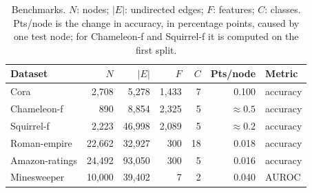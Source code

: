 \begin{table}[t]
\centering
\caption{Benchmarks. $N$: nodes; $|E|$: undirected edges; $F$: features; $C$: classes. Pts/node is the change in accuracy, in percentage points, caused by one test node; for Chameleon-f and Squirrel-f it is computed on the first split.}
\label{tab:data}
\small
\begin{tabular}{lrrrrrl}
\toprule
Dataset & $N$ & $|E|$ & $F$ & $C$ & Pts/node & Metric \\
\midrule
Cora & 2,708 & 5,278 & 1,433 & 7 & 0.100 & accuracy \\
Chameleon-f & 890 & 8,854 & 2,325 & 5 & ${\approx}0.5$ & accuracy \\
Squirrel-f & 2,223 & 46,998 & 2,089 & 5 & ${\approx}0.2$ & accuracy \\
Roman-empire & 22,662 & 32,927 & 300 & 18 & 0.018 & accuracy \\
Amazon-ratings & 24,492 & 93,050 & 300 & 5 & 0.016 & accuracy \\
Minesweeper & 10,000 & 39,402 & 7 & 2 & 0.040 & AUROC \\
\bottomrule
\end{tabular}
\end{table}
